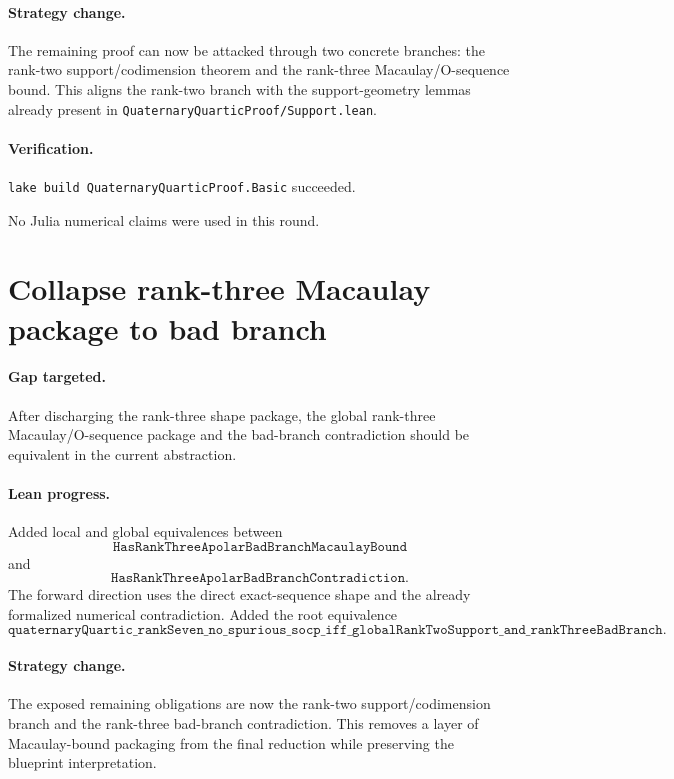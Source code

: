 \documentclass[11pt]{article}
\begin{document}
\paragraph{Strategy change.}
The remaining proof can now be attacked through two concrete branches: the
rank-two support/codimension theorem and the rank-three Macaulay/O-sequence
bound.  This aligns the rank-two branch with the support-geometry lemmas
already present in \texttt{QuaternaryQuarticProof/Support.lean}.

\paragraph{Verification.}
\texttt{lake build QuaternaryQuarticProof.Basic} succeeded.

No Julia numerical claims were used in this round.

\section*{Collapse rank-three Macaulay package to bad branch}

\paragraph{Gap targeted.}
After discharging the rank-three shape package, the global rank-three
Macaulay/O-sequence package and the bad-branch contradiction should be
equivalent in the current abstraction.

\paragraph{Lean progress.}
Added local and global equivalences between
\[
\texttt{HasRankThreeApolarBadBranchMacaulayBound}
\]
and
\[
\texttt{HasRankThreeApolarBadBranchContradiction}.
\]
The forward direction uses the direct exact-sequence shape and the already
formalized numerical contradiction.  Added the root equivalence
\[
\texttt{quaternaryQuartic\_rankSeven\_no\_spurious\_socp\_iff\_globalRankTwoSupport\_and\_rankThreeBadBranch}.
\]

\paragraph{Strategy change.}
The exposed remaining obligations are now the rank-two support/codimension
branch and the rank-three bad-branch contradiction.  This removes a layer of
Macaulay-bound packaging from the final reduction while preserving the
blueprint interpretation.
\end{document}
